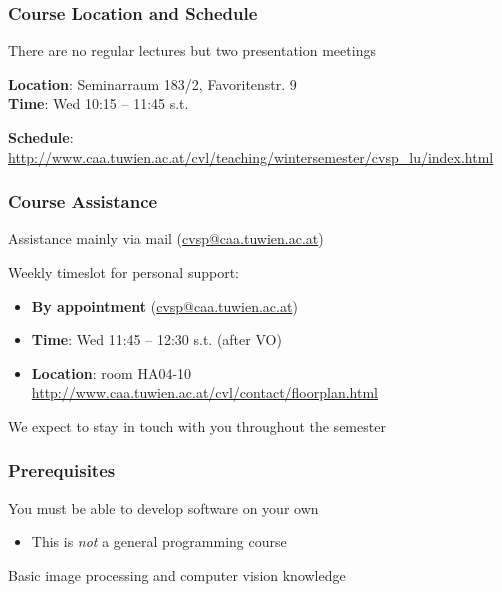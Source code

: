 \documentclass[xetex]{beamer}
\begin{document}

\begin{frame}
\frametitle{Course Location and Schedule}

There are no regular lectures but two presentation meetings

\bigskip
\textbf{Location}: Seminarraum 183/2, Favoritenstr. 9\\
\textbf{Time}: Wed 10:15 -- 11:45 s.t.

\bigskip
\textbf{Schedule}: \url{http://www.caa.tuwien.ac.at/cvl/teaching/wintersemester/cvsp_lu/index.html}

\end{frame}


\begin{frame}
\frametitle{Course Assistance}

Assistance mainly via mail (\url{cvsp@caa.tuwien.ac.at})

\bigskip
Weekly timeslot for personal support:
\begin{itemize}
	\item \textbf{By appointment} (\url{cvsp@caa.tuwien.ac.at})
	\item \textbf{Time}: Wed 11:45 -- 12:30 s.t. (after VO)
	\item \textbf{Location}: room HA04-10 \scriptsize\url{http://www.caa.tuwien.ac.at/cvl/contact/floorplan.html}\normalsize
\end{itemize}

\bigskip
We expect to stay in touch with you throughout the semester

\end{frame}


\begin{frame}
\frametitle{Prerequisites}

You must be able to develop software on your own
\begin{itemize}
	\item This is \emph{not} a general programming course
\end{itemize}

\bigskip
Basic image processing and computer vision knowledge

\end{frame}
\end{document}
